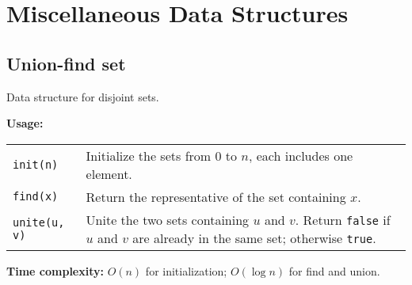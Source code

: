 
\newcommand{\BookNo}{3}
\newcommand{\BookTitle}{Data Structures}


\setmainfont{Times New Roman}
\setlength{\parskip}{0.0in}
\tableofcontents
\setlength{\parskip}{0.1in}
\newevenpage
\section{Miscellaneous Data Structures}
\subsection{Union-find set}
Data structure for disjoint sets. \par
\textbf{Usage:} \\[0.1cm]
\begin{tabular}{p{2cm} p{9.5cm}}
  \lstinline|init(n)| & Initialize the sets from 0 to $n$, each includes one element. \\
  \lstinline|find(x)| & Return the representative of the set containing $x$. \\
  \lstinline|unite(u, v)| & Unite the two sets containing $u$ and $v$. Return \lstinline|false| if $u$ and $v$ are already in the same set; otherwise \lstinline|true|. \\
\end{tabular} \par
\textbf{Time complexity:} $O(n)$ for initialization; $O(\log n)$ for find and union. \par



